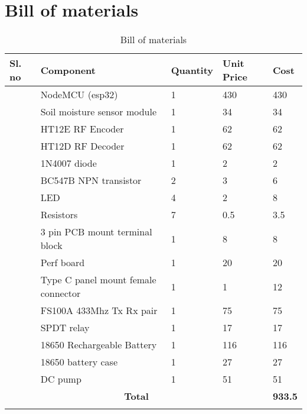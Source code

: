 \newpage
\chapter{Bill of materials}
\renewcommand{\arraystretch}{1.5}

\newcommand\rnum{\stepcounter{tocostnum}\arabic{tocostnum}}

\begin{longtable}[h!]{|l|l|l|l|l|} \hline
\textbf{Sl. no} & \textbf{Component}            & \textbf{Quantity} & \textbf{Unit Price} & \textbf{Cost} \\ \hline
	\rnum  & NodeMCU (esp32)                    & 1        & 430        & 430  \\ \hline
	\rnum  & Soil moisture sensor module        & 1        &  34        & 34   \\ \hline
	\rnum  & HT12E RF Encoder                   & 1        &  62        & 62   \\ \hline
	\rnum  & HT12D RF Decoder                   & 1        &  62        & 62   \\ \hline
	\rnum  & 1N4007 diode                       & 1        &   2        & 2    \\ \hline
	\rnum  & BC547B NPN transistor              & 2        &   3        & 6    \\ \hline
	\rnum  & LED                                & 4        &   2        & 8    \\ \hline
	\rnum  & Resistors                          & 7        &   0.5      & 3.5  \\ \hline
	\rnum  & 3 pin PCB mount terminal block     & 1        &   8        & 8    \\ \hline
	\rnum  & Perf board                         & 1        &  20        & 20   \\ \hline
	\rnum  & Type C panel mount female connector& 1        &   1        & 12   \\ \hline
	\rnum  & FS100A 433Mhz Tx Rx pair           & 1        &  75        & 75   \\ \hline
	\rnum  & SPDT relay                         & 1        &  17        & 17   \\ \hline
	\rnum  & 18650 Rechargeable Battery         & 1        & 116        & 116  \\ \hline
	\rnum  & 18650 battery case                 & 1        &  27        & 27   \\ \hline
	\rnum  & DC pump                            & 1        &  51        & 51   \\ \hline
	\multicolumn{4}{|c|}{\textbf{Total}}& \textbf{933.5} \\ \hline
	\caption{Bill of materials}
\end{longtable}
